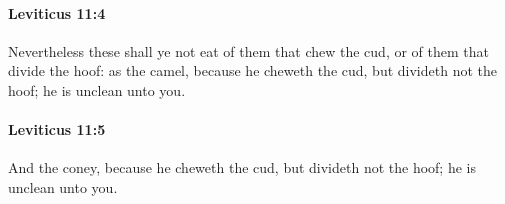 		\paragraph{Leviticus 11:4} %
			\label{LEVITICUS-11-4}

			Nevertheless these shall ye not eat of them that chew the cud, or of them that divide the hoof: as the camel, because he cheweth the cud, but divideth not the hoof; he is unclean unto you.


		\paragraph{Leviticus 11:5} %
			\label{LEVITICUS-11-5}

			And the coney, because he cheweth the cud, but divideth not the hoof; he is unclean unto you.



